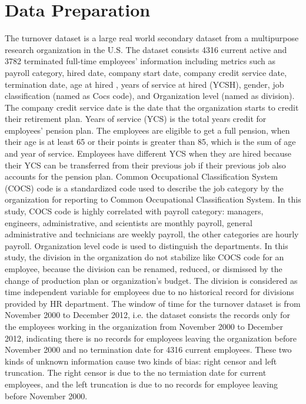 \documentclass[12pt,letterpaper]{article}
\begin{document}
\section{Data Preparation}
The turnover dataset is a large real world secondary dataset from a multipurpose research organization in the U.S. The dataset consists 4316 current active and 3782 terminated full-time employees' information including metrics such as payroll category, hired date, company start date, company credit service date, termination date, age at hired , years of service at hired (YCSH), gender, job classification (named as Cocs code), and Organization level (named as division). The company credit service date is the date that the organization starts to credit their retirement plan. Years of service (YCS) is the total years credit for employees' pension plan. The employees are eligible to get a full pension, when their age is at least 65 or their points is greater than 85, which is the sum of age and year of service. Employees have different YCS when they are hired because their YCS can be transferred from their previous job if their previous job also accounts for the pension plan. %
Common Occupational Classification System (COCS) code is a standardized code used to describe the job category by the organization for reporting to Common Occupational Classification System. In this study, COCS code is highly correlated with payroll category: managers, engineers, administrative, and scientists are monthly payroll, general administrative and technicians are weekly payroll, the other categories are hourly payroll.
Organization level code is used to distinguish the departments. In this study, the division in the organization do not stabilize like COCS code for an employee, because the division can be renamed, reduced, or dismissed by the change of production plan or organization's budget. The division is considered as time independent variable for employees due to no historical record for divisions provided by HR department.
The window of time for the turnover dataset is from November 2000 to December 2012, i.e. the dataset consists the records only for the employees working in the organization from November 2000 to December 2012, indicating there is no records for employees leaving the organization before November 2000 and no termination date for 4316 current employees. These two kinds of unknown information cause two kinds of bias: right censor and left truncation. The right censor is due to the no termiation date for current employees, and the left truncation is due to no records for employee leaving before November 2000.
\end{document}
